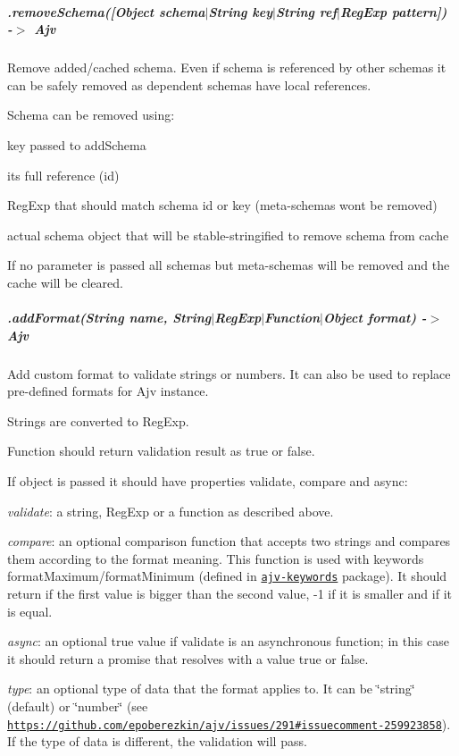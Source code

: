 \subparagraph*{.remove\+Schema(\mbox{[}Object schema$\vert$\+String key$\vert$\+String ref$\vert$\+Reg\+Exp pattern\mbox{]}) -\/$>$ Ajv}

Remove added/cached schema. Even if schema is referenced by other schemas it can be safely removed as dependent schemas have local references.

Schema can be removed using\+:
\begin{DoxyItemize}
\item key passed to {\ttfamily add\+Schema}
\item it\textquotesingle{}s full reference (id)
\item Reg\+Exp that should match schema id or key (meta-\/schemas won\textquotesingle{}t be removed)
\item actual schema object that will be stable-\/stringified to remove schema from cache
\end{DoxyItemize}

If no parameter is passed all schemas but meta-\/schemas will be removed and the cache will be cleared.

\subparagraph*{\label{_api-addformat}%
.add\+Format(String name, String$\vert$\+Reg\+Exp$\vert$\+Function$\vert$\+Object format) -\/$>$ Ajv}

Add custom format to validate strings or numbers. It can also be used to replace pre-\/defined formats for Ajv instance.

Strings are converted to Reg\+Exp.

Function should return validation result as {\ttfamily true} or {\ttfamily false}.

If object is passed it should have properties {\ttfamily validate}, {\ttfamily compare} and {\ttfamily async}\+:


\begin{DoxyItemize}
\item {\itshape validate}\+: a string, Reg\+Exp or a function as described above.
\item {\itshape compare}\+: an optional comparison function that accepts two strings and compares them according to the format meaning. This function is used with keywords {\ttfamily format\+Maximum}/{\ttfamily format\+Minimum} (defined in \href{https://github.com/epoberezkin/ajv-keywords}{\tt ajv-\/keywords} package). It should return {} if the first value is bigger than the second value, {\ttfamily -\/1} if it is smaller and {} if it is equal.
\item {\itshape async}\+: an optional {\ttfamily true} value if {\ttfamily validate} is an asynchronous function; in this case it should return a promise that resolves with a value {\ttfamily true} or {\ttfamily false}.
\item {\itshape type}\+: an optional type of data that the format applies to. It can be {\ttfamily \char`\"{}string\char`\"{}} (default) or {\ttfamily \char`\"{}number\char`\"{}} (see \href{https://github.com/epoberezkin/ajv/issues/291#issuecomment-259923858}{\tt https\+://github.\+com/epoberezkin/ajv/issues/291\#issuecomment-\/259923858}). If the type of data is different, the validation will pass.
\end{DoxyItemize}

